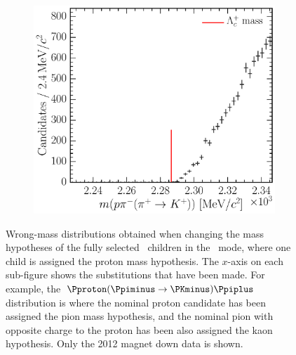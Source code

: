 \begin{figure}
\begin{subfigure}[b]{0.3\textwidth}
    \caption{\decay{\PLambdac}{\Pproton\PKminus\PKplus}}
    \label{fig:cpv:selection:background_study:ppipi_baryon:pkk}
  \end{subfigure}
  \begin{subfigure}[b]{0.3\textwidth}
    \includegraphics[width=\textwidth]{figures/cpv/selection/background_study/ppipi/LcToppipi_2012_MagDown_Lc_pp_pim_pipTokp}
    \caption{\decay{\PLambdac}{\Pproton\Ppiminus\PKplus}}
    \label{fig:cpv:selection:background_study:ppipi_baryon:ppik}
  \end{subfigure}
  \caption{%
    Wrong-mass distributions obtained when changing the mass hypotheses of the 
    fully selected \PLambdac\ children in the \ppipi\ mode, where one child is 
    assigned the proton mass hypothesis.
    The $x$-axis on each sub-figure shows the substitutions that have been 
    made.
    For example, the ${\Pproton(\Ppiminus \to \PKminus)\Ppiplus}$ distribution is where the 
    nominal proton candidate has been assigned the pion mass hypothesis, and 
    the nominal pion with opposite charge to the proton has been also assigned 
    the kaon hypothesis.
    Only the 2012 magnet down data is shown.
  }
  \label{fig:cpv:selection:background_study:ppipi_baryon}
\end{figure}

